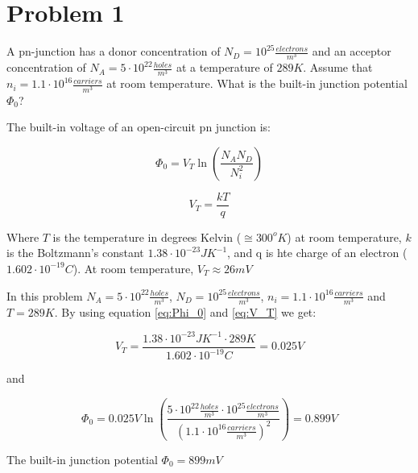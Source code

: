 \section{Problem 1}

A pn-junction has a donor concentration of $N_D = 10^{25} \frac{electrons}{m^3}$ and an acceptor concentration of $N_A = 5\cdot 10^{22} \frac{holes}{m^3}$ at a temperature of $289 K$. Assume that $n_i = 1.1\cdot 10^{16} \frac{carriers}{m^3}$ at room temperature. What is the built-in junction potential $\Phi_0$?

The built-in voltage of an open-circuit pn junction is:

\begin{equation}
    \Phi_0 = V_T \ln (\frac{N_A N_D}{N_i^2})
    \label{eq:Phi_0}
\end{equation}

\begin{equation}
    V_T=\frac{kT}{q}
    \label{eq:V_T}
\end{equation}

Where $T$ is the temperature in degrees Kelvin ($\cong 300 ^o K$) at room temperature, $k$ is the Boltzmann's constant $1.38\cdot 10^{-23} JK^{-1}$, and q is hte charge of an electron ($1.602\cdot 10^{-19} C$). At room temperature, $V_T\approx 26 mV$

In this problem $N_A=5\cdot 10^{22} \frac{holes}{m^3}$, $N_D = 10^{25} \frac{electrons}{m^3}$, $n_i = 1.1\cdot 10^{16} \frac{carriers}{m^3}$ and $T=289 K$. By using equation \ref{eq:Phi_0} and \ref{eq:V_T} we get:

\begin{equation}
    V_T=\frac{1.38\cdot 10^{-23} JK^{-1} \cdot 289K}{1.602\cdot 10^{-19} C} = 0.025V
\end{equation}

and

\begin{equation}
    \Phi_0 = 0.025V \ln (\frac{5\cdot 10^{22} \frac{holes}{m^3} \cdot 10^{25} \frac{electrons}{m^3}}{(1.1\cdot 10^{16} \frac{carriers}{m^3})^2}) = 0.899V
\end{equation}

The built-in junction potential $\Phi_0 = 899mV$

